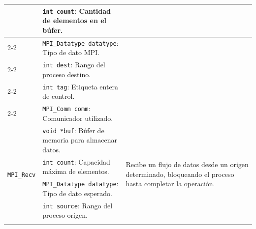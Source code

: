 \begin{table}[h]
\begin{tabular}{|l|p{6.0cm}|p{5.0cm}|}
		                                          & \texttt{int count}: Cantidad de elementos en el búfer.                          &                                                                                                                                \\ \cline{2-2}
		                                          & \texttt{MPI\_Datatype datatype}: Tipo de dato MPI.                              &                                                                                                                                \\ \cline{2-2}
		                                          & \texttt{int dest}: Rango del proceso destino.                                   &                                                                                                                                \\ \cline{2-2}
		                                          & \texttt{int tag}: Etiqueta entera de control.                                   &                                                                                                                                \\ \cline{2-2}
		                                          & \texttt{MPI\_Comm comm}: Comunicador utilizado.                                 &                                                                                                                                \\ \hline
		\multirow{7}{*}{\texttt{MPI\_Recv}}       & \texttt{void *buf}: Búfer de memoria para almacenar datos.                      & \multirow{7}{5.0cm}{Recibe un flujo de datos desde un origen determinado, bloqueando el proceso hasta completar la operación.} \\ \cline{2-2}
		                                          & \texttt{int count}: Capacidad máxima de elementos.                              &                                                                                                                                \\ \cline{2-2}
		                                          & \texttt{MPI\_Datatype datatype}: Tipo de dato esperado.                         &                                                                                                                                \\ \cline{2-2}
		                                          & \texttt{int source}: Rango del proceso origen.                                  &                                                                                                                                \\ \cline{2-2}

\end{tabular}
\end{table}
